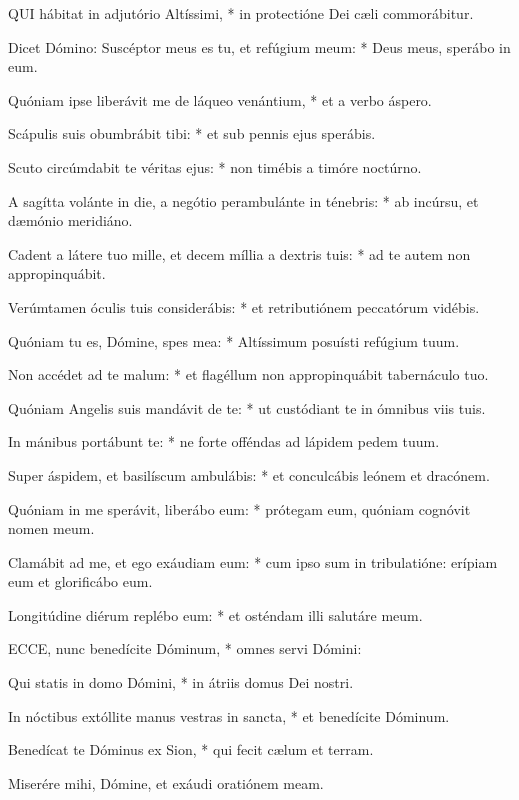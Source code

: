 
\lettrine[lines=2]{Q}{UI} hábitat in adjutório Altíssimi, * in protectióne Dei cæli commorábitur.

Dicet Dómino: Suscéptor meus es tu, et refúgium meum: * Deus meus, sperábo in eum.

Quóniam ipse liberávit me de láqueo venántium, * et a verbo áspero.

Scápulis suis obumbrábit tibi: * et sub pennis ejus sperábis.

Scuto circúmdabit te véritas ejus: * non timébis a timóre noctúrno.

A sagítta volánte in die, a negótio perambulánte in ténebris: * ab incúrsu, et dæmónio meridiáno.

Cadent a látere tuo mille, et decem míllia a dextris tuis: * ad te autem non appropinquábit.

Verúmtamen óculis tuis considerábis: * et retributiónem peccatórum vidébis.

Quóniam tu es, Dómine, spes mea: * Altíssimum posuísti refúgium tuum.

Non accédet ad te malum: * et flagéllum non appropinquábit tabernáculo tuo.

Quóniam Angelis suis mandávit de te: * ut custódiant te in ómnibus viis tuis.

In mánibus portábunt te: * ne forte offéndas ad lápidem pedem tuum.

Super áspidem, et basilíscum ambulábis: * et conculcábis leónem et dracónem.

Quóniam in me sperávit, liberábo eum: * prótegam eum, quóniam cognóvit nomen meum.

Clamábit ad me, et ego exáudiam eum: * cum ipso sum in tribulatióne: erípiam eum et glorificábo eum.

Longitúdine diérum replébo eum: * et osténdam illi salutáre meum.


\lettrine[lines=2]{E}{CCE}, nunc benedícite Dóminum, * omnes servi Dómini:

Qui statis in domo Dómini, * in átriis domus Dei nostri.

In nóctibus extóllite manus vestras in sancta, * et benedícite Dóminum.

Benedícat te Dóminus ex Sion, * qui fecit cælum et terram.

 Miserére mihi, Dómine, et exáudi oratiónem meam.


